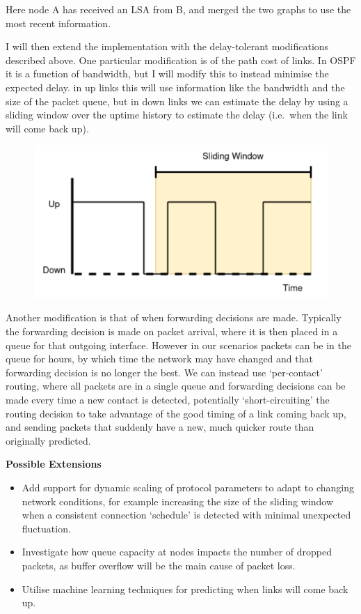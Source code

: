 \documentclass[withindex,glossary,openany]{cam-thesis}
\begin{document}
Here node A has received an LSA from B, and merged the two graphs to use the most recent information.

I will then extend the implementation with the delay-tolerant modifications described above. One particular modification is of the path cost of links. In OSPF it is a function of bandwidth, but I will modify this to instead minimise the expected delay. in up links this will use information like the bandwidth and the size of the packet queue, but in down links we can estimate the delay by using a sliding window over the uptime history to estimate the delay (i.e.\ when the link will come back up).

\begin{figure}[H]
  \centering
  \includegraphics[width=0.6\linewidth]{proposal_3}
\end{figure}

Another modification is that of when forwarding decisions are made. Typically the forwarding decision is made on packet arrival, where it is then placed in a queue for that outgoing interface. However in our scenarios packets can be in the queue for hours, by which time the network may have changed and that forwarding decision is no longer the best. We can instead use `per-contact’ routing, where all packets are in a single queue and forwarding decisions can be made every time a new contact is detected, potentially `short-circuiting’ the routing decision to take advantage of the good timing of a link coming back up, and sending packets that suddenly have a new, much quicker route than originally predicted.

\vspace{8mm}
\LARGE\textbf{Possible Extensions}\normalsize

\begin{itemize}
\item
Add support for dynamic scaling of protocol parameters to adapt to changing network conditions, for example increasing the size of the sliding window when a consistent connection `schedule’ is detected with minimal unexpected fluctuation.

\item
Investigate how queue capacity at nodes impacts the number of dropped packets, as buffer overflow will be the main cause of packet loss.

\item
Utilise machine learning techniques for predicting when links will come back up.
\end{itemize}
\end{document}
